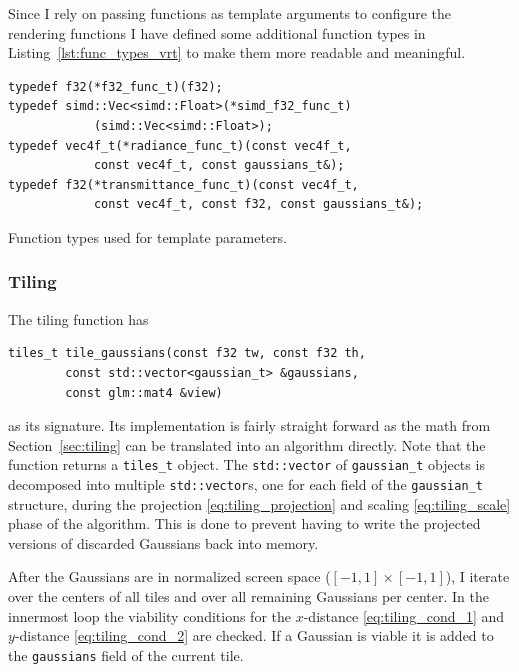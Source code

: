 \documentclass[a4paper, 11pt]{memoir}
\begin{document}
    Since I rely on passing functions as template arguments to configure the rendering functions I have defined some
    additional function types in Listing~\ref{lst:func_types_vrt} to make them more readable and meaningful.

    \begin{listing}[H]
        \begin{verbatim}
typedef f32(*f32_func_t)(f32);
typedef simd::Vec<simd::Float>(*simd_f32_func_t)
            (simd::Vec<simd::Float>);
typedef vec4f_t(*radiance_func_t)(const vec4f_t,
            const vec4f_t, const gaussians_t&);
typedef f32(*transmittance_func_t)(const vec4f_t,
            const vec4f_t, const f32, const gaussians_t&);
        \end{verbatim}
        \caption{Function types used for template parameters.}
        \label{lst:func_types_vrt}
    \end{listing}

    \subsubsection{Tiling}
    The tiling function has
    \begin{verbatim}
tiles_t tile_gaussians(const f32 tw, const f32 th,
        const std::vector<gaussian_t> &gaussians,
        const glm::mat4 &view)
    \end{verbatim}
    as its signature. Its implementation is fairly straight forward as the math from Section~\ref{sec:tiling} can be
    translated into an algorithm directly. Note that the function returns a \texttt{tiles_t} object. The
    \texttt{std::vector} of \texttt{gaussian_t} objects is decomposed into
    multiple \texttt{std::vector}s, one for each field of the \texttt{gaussian_t} structure, during
    the projection \eqref{eq:tiling_projection} and scaling \eqref{eq:tiling_scale} phase of the algorithm. This is done
    to prevent having to write the projected versions of discarded Gaussians back into memory.

    After the Gaussians are in normalized screen space ($[-1, 1] \times [-1, 1]$), I iterate over the centers of all
    tiles and over all remaining Gaussians per center. In the innermost loop the viability conditions for the $x$-distance
    \eqref{eq:tiling_cond_1} and $y$-distance \eqref{eq:tiling_cond_2} are checked. If a Gaussian is viable it is
    added to the \texttt{gaussians} field of the current tile.
\end{document}

